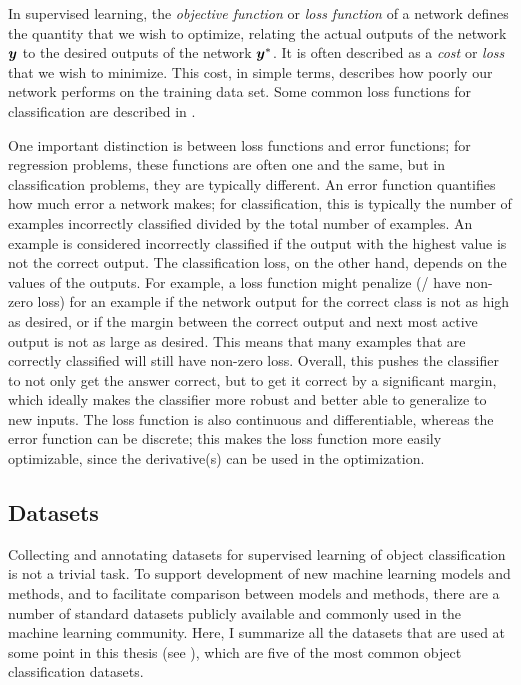 In supervised learning,
the \emph{objective function} or \emph{loss function} of a network
defines the quantity that we wish to optimize,
relating the actual outputs of the network $\boldsymbol{y}$
to the desired outputs of the network $\boldsymbol{y}^*$.
It is often described as a \emph{cost} or \emph{loss}
that we wish to minimize.
This cost, in simple terms, describes how poorly our network performs
on the training data set.
Some common loss functions for classification are described in .

One important distinction is between loss functions and error functions;
for regression problems, these functions are often one and the same,
but in classification problems, they are typically different.
An error function quantifies how much error a network makes;
for classification, this is typically the number of examples incorrectly classified
divided by the total number of examples.
An example is considered incorrectly classified
if the output with the highest value is not the correct output.
The classification loss, on the other hand,
depends on the values of the outputs.
For example, a loss function might penalize (\ie/ have non-zero loss)
for an example if the network output for the correct class is not as high as desired,
or if the margin between the correct output and next most active output
is not as large as desired.
This means that many examples that are correctly classified
will still have non-zero loss.
Overall, this pushes the classifier to not only get the answer correct,
but to get it correct by a significant margin,
which ideally makes the classifier more robust
and better able to generalize to new inputs.
The loss function is also continuous and differentiable,
whereas the error function can be discrete;
this makes the loss function more easily optimizable,
since the derivative(s) can be used in the optimization.


\subsection{Datasets}

Collecting and annotating datasets
for supervised learning of object classification
is not a trivial task.
To support development of new machine learning models and methods,
and to facilitate comparison between models and methods,
there are a number of standard datasets
publicly available and commonly used in the machine learning community.
Here, I summarize all the datasets that are used at some point
in this thesis (see ),
which are five of the most common object classification datasets.

